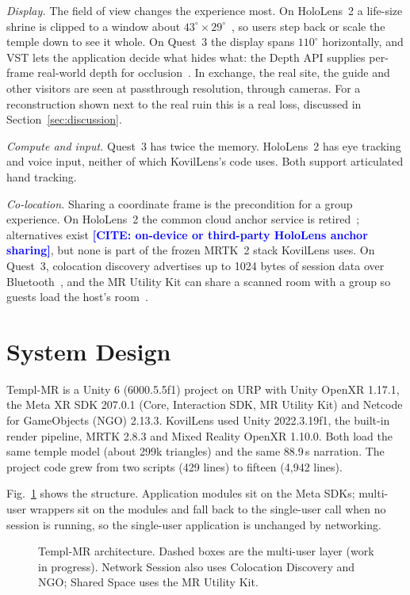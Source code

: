 \documentclass[conference]{IEEEtran}
\newcommand{\CITE}[1]{\textcolor{blue}{\textbf{[CITE#1]}}}
\begin{document}
\textit{Display.} The field of view changes the experience most. On HoloLens~2 a life-size shrine is clipped to a window about $43^\circ{\times}29^\circ$~\cite{hl2fov}, so users step back or scale the temple down to see it whole. On Quest~3 the display spans $110^\circ$ horizontally, and VST lets the application decide what hides what: the Depth API supplies per-frame real-world depth for occlusion~\cite{metadepth}. In exchange, the real site, the guide and other visitors are seen at passthrough resolution, through cameras. For a reconstruction shown next to the real ruin this is a real loss, discussed in Section~\ref{sec:discussion}.

\textit{Compute and input.} Quest~3 has twice the memory. HoloLens~2 has eye tracking and voice input, neither of which KovilLens's code uses. Both support articulated hand tracking.

\textit{Co-location.} Sharing a coordinate frame is the precondition for a group experience. On HoloLens~2 the common cloud anchor service is retired~\cite{asaretire}; alternatives exist \CITE{: on-device or third-party HoloLens anchor sharing}, but none is part of the frozen MRTK~2 stack KovilLens uses. On Quest~3, colocation discovery advertises up to 1024 bytes of session data over Bluetooth~\cite{metacolocation}, and the MR Utility Kit can share a scanned room with a group so guests load the host's room~\cite{metaspacesharing}.

\section{System Design}\label{sec:design}
Templ-MR is a Unity 6 (6000.5.5f1) project on URP with Unity OpenXR 1.17.1, the Meta XR SDK 207.0.1 (Core, Interaction SDK, MR Utility Kit) and Netcode for GameObjects (NGO) 2.13.3. KovilLens used Unity 2022.3.19f1, the built-in render pipeline, MRTK 2.8.3 and Mixed Reality OpenXR 1.10.0. Both load the same temple model (about 299k triangles) and the same 88.9\,s narration. The project code grew from two scripts (429 lines) to fifteen (4,942 lines).

Fig.~\ref{fig:arch} shows the structure. Application modules sit on the Meta SDKs; multi-user wrappers sit on the modules and fall back to the single-user call when no session is running, so the single-user application is unchanged by networking.

\begin{figure}[t]
\centering
\resizebox{\columnwidth}{!}{}
\caption{Templ-MR architecture. Dashed boxes are the multi-user layer (work in progress). Network Session also uses Colocation Discovery and NGO; Shared Space uses the MR Utility Kit.}
\label{fig:arch}
\end{figure}
\end{document}
